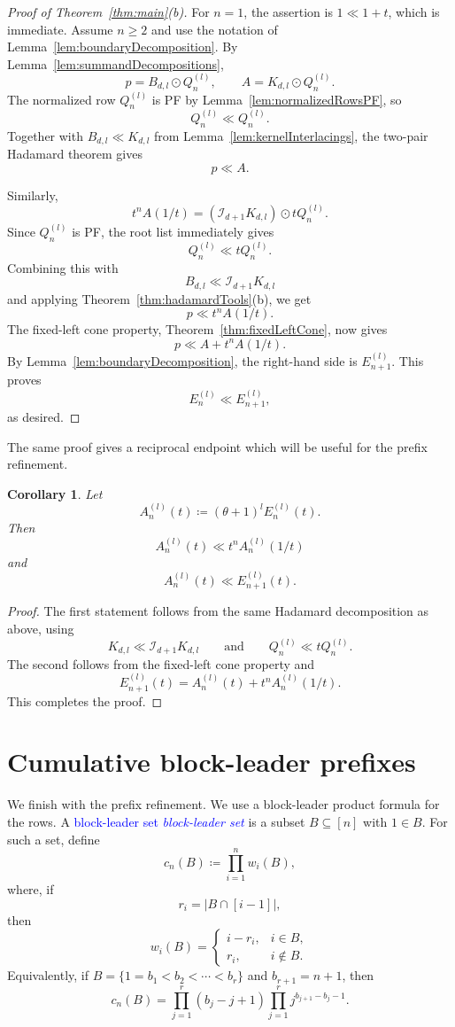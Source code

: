 \documentclass[reqno]{amsart}
\numberwithin{equation}{section}
\newtheorem{corollary}[theorem]{Corollary}
\theoremstyle{definition}
\newcommand{\defin}[1]{%
\relax\ifmmode%
\textcolor{blue}{#1}%
\else\textcolor{blue}{\emph{#1}}%
\fi%
}
\newcommand{\had}{\odot}
\newcommand{\opI}{\mathcal{I}}
\begin{document}
\begin{proof}[Proof of Theorem~\ref{thm:main}(b)]
For $n=1$, the assertion is $1\ll 1+t$, which is immediate.  Assume
$n\geq 2$ and use the notation of Lemma~\ref{lem:boundaryDecomposition}.
By Lemma~\ref{lem:summandDecompositions},
\[
  p=B_{d,l}\had Q_n^{(l)},\qquad
  A=K_{d,l}\had Q_n^{(l)}.
\]
The normalized row $Q_n^{(l)}$ is PF by Lemma~\ref{lem:normalizedRowsPF}, so
\[
  Q_n^{(l)}\ll Q_n^{(l)}.
\]
Together with $B_{d,l}\ll K_{d,l}$ from
Lemma~\ref{lem:kernelInterlacings}, the two-pair Hadamard theorem gives
\[
  p\ll A.
\]

Similarly,
\[
  t^nA(1/t)
  =
  (\opI_{d+1}K_{d,l})\had tQ_n^{(l)}.
\]
Since $Q_n^{(l)}$ is PF, the root list immediately gives
\[
  Q_n^{(l)}\ll tQ_n^{(l)}.
\]
Combining this with
\[
  B_{d,l}\ll \opI_{d+1}K_{d,l}
\]
and applying Theorem~\ref{thm:hadamardTools}(b), we get
\[
  p\ll t^nA(1/t).
\]
The fixed-left cone property, Theorem~\ref{thm:fixedLeftCone}, now gives
\[
  p\ll A+t^nA(1/t).
\]
By Lemma~\ref{lem:boundaryDecomposition}, the right-hand side is
$E_{n+1}^{(l)}$.  This proves
\[
  E_n^{(l)}\ll E_{n+1}^{(l)},
\]
as desired.
\end{proof}

The same proof gives a reciprocal endpoint which will be useful for the prefix
refinement.

\begin{corollary}
\label{cor:boundaryEndpoint}
Let
\[
  A_n^{(l)}(t)\coloneqq (\theta+1)^lE_n^{(l)}(t).
\]
Then
\[
  A_n^{(l)}(t)\ll t^nA_n^{(l)}(1/t)
\]
and
\[
  A_n^{(l)}(t)\ll E_{n+1}^{(l)}(t).
\]
\end{corollary}

\begin{proof}
The first statement follows from the same Hadamard decomposition as above,
using
\[
  K_{d,l}\ll \opI_{d+1}K_{d,l}
  \qquad\text{and}\qquad
  Q_n^{(l)}\ll tQ_n^{(l)}.
\]
The second follows from the fixed-left cone property and
\[
  E_{n+1}^{(l)}(t)=A_n^{(l)}(t)+t^nA_n^{(l)}(1/t).
\]
This completes the proof.
\end{proof}

\section{Cumulative block-leader prefixes}
\label{sec:prefixes}

We finish with the prefix refinement.  We use a block-leader product formula
for the rows.  A \defin{block-leader set} is a subset $B\subseteq[n]$ with
$1\in B$.  For such a set, define
\[
  c_n(B)\coloneqq \prod_{i=1}^{n}w_i(B),
\]
where, if
\[
  r_i=|B\cap[i-1]|,
\]
then
\[
  w_i(B)=
  \begin{cases}
  i-r_i, & i\in B,\\
  r_i, & i\notin B.
  \end{cases}
\]
Equivalently, if $B=\{1=b_1<b_2<\dotsb<b_r\}$ and $b_{r+1}=n+1$, then
\[
  c_n(B)
  =
  \prod_{j=1}^{r}(b_j-j+1)
  \prod_{j=1}^{r}j^{b_{j+1}-b_j-1}.
\]
\end{document}
